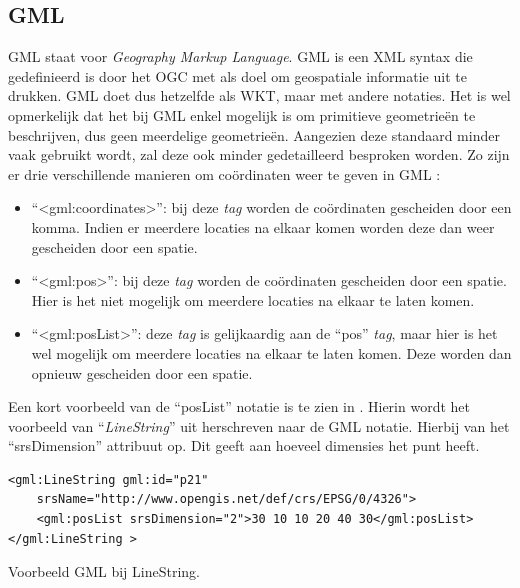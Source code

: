 \subsection{GML}
GML staat voor \textit{Geography Markup Language}. GML is een XML syntax die gedefinieerd is door het OGC met als doel om geospatiale informatie uit te drukken. GML doet dus hetzelfde als WKT, maar met andere notaties. Het is wel opmerkelijk dat het bij GML enkel mogelijk is om primitieve geometrieën te beschrijven, dus geen meerdelige geometrieën. Aangezien deze standaard minder vaak gebruikt wordt, zal deze ook minder gedetailleerd besproken worden. Zo zijn er drie verschillende manieren om coördinaten weer te geven in GML \cite{ogcdocs}:
\begin{itemize}
    \item ``<gml:coordinates>'': bij deze \textit{tag} worden de coördinaten gescheiden door een komma. Indien er meerdere locaties na elkaar komen worden deze dan weer gescheiden door een spatie.
    \item ``<gml:pos>'': bij deze \textit{tag} worden de coördinaten gescheiden door een spatie. Hier is het niet mogelijk om meerdere locaties na elkaar te laten komen.
    \item ``<gml:posList>'': deze \textit{tag} is gelijkaardig aan de ``pos'' \textit{tag}, maar hier is het wel mogelijk om meerdere locaties na elkaar te laten komen. Deze worden dan opnieuw gescheiden door een spatie.
\end{itemize}

Een kort voorbeeld van de ``posList'' notatie is te zien in . Hierin wordt het voorbeeld van ``\textit{LineString}'' uit  herschreven naar de GML notatie. Hierbij van het ``srsDimension'' attribuut op. Dit geeft aan hoeveel dimensies het punt heeft.

\begin{listing}[ht]
\begin{verbatim}
<gml:LineString gml:id="p21"
    srsName="http://www.opengis.net/def/crs/EPSG/0/4326">
    <gml:posList srsDimension="2">30 10 10 20 40 30</gml:posList>
</gml:LineString >
\end{verbatim}
\caption{Voorbeeld GML bij LineString.}
\label{listing:gml}
\end{listing}

